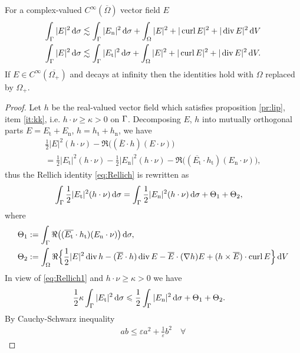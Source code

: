 \begin{lmm}\label{lm:start}
  For a complex-valued $C^{\infty}(\overline{\Omega})$ vector field $E$
  \begin{align}
    \int_{\Gamma}|E|^2\,\text{d}\sigma &\lesssim \int_{\Gamma}|E_{\text{n}}|^2\,\text{d}\sigma+\int_{\Omega}|E|^2+|\operatorname{curl} E|^2+|\operatorname{div} E|^2\,\text{d}V
    \label{eq:En}\\
    \int_{\Gamma}|E|^2\,\text{d}\sigma &\lesssim \int_{\Gamma}|E_{\text{t}}|^2\,\text{d}\sigma+\int_{\Omega}|E|^2+|\operatorname{curl} E|^2+|\operatorname{div} E|^2\,\text{d}V
    \label{eq:Et}.
  \end{align}
  If $E\in C^{\infty}(\overline{\Omega_+})$ and decays at infinity then the
  identities hold with $\Omega$ replaced by $\Omega_+$.
\end{lmm}
\begin{proof}
  Let $h$ be the real-valued vector field which satisfies proposition 
  \ref{pr:lip}, item \eqref{it:kk}, i.e. $h\cdot\nu\geqslant\kappa>0$ on $\Gamma$. Decomposing $E$, $h$ into mutually orthogonal parts 
  $E=E_{\text{t}}+E_{\text{n}}$, $h=h_{\text{t}}+h_{\text{n}}$, we have 
  \begin{multline*}
    \frac{1}{2}|E|^2(h\cdot\nu)-\Re\bigl((\overline{E}\cdot h)(E\cdot\nu)
    \bigr)\\
    =\frac{1}{2}|E_{\text{t}}|^2(h\cdot\nu)-\frac{1}{2}|E_{\text{n}}|^2(h\cdot\nu)-
    \Re\bigl((\overline{E_{\text{t}}}\cdot h_{\text{t}})(E_{\text{n}}\cdot\nu)\bigr),
  \end{multline*}
  thus the Rellich identity \eqref{eq:Rellich} is rewritten as
  \begin{align}
    \int_{\Gamma}\frac{1}{2}|E_{\text{t}}|^2(h\cdot\nu)\,\text{d}\sigma&=
    \int_{\Gamma}\frac{1}{2}|E_{\text{n}}|^2(h\cdot\nu)\,\text{d}\sigma+\Theta_1+\Theta_2,
    \label{eq:Rellich1}
  \end{align}
  where
  \begin{align*}
    \Theta_1 &:=\int_{\Gamma}\Re\bigl((\overline{E_{\text{t}}}\cdot h_{\text{t}})(E_{\text{n}}\cdot\nu)\bigr)\,\text{d}\sigma,
    \\
    \Theta_2 &:=\int_{\Omega}\Re\Bigl\{\frac{1}{2}|E|^2\operatorname{div} h-(\overline{E}\cdot h)
    \operatorname{div} E-\overline{E}\cdot(\nabla h)E+(h\times\overline{E})\cdot\operatorname{curl} E
    \Bigr\}\,\text{d}V
  \end{align*}
  In view of \eqref{eq:Rellich1} and $h\cdot\nu\geqslant\kappa>0$
  we have
  \begin{align}\label{eq:ineq1}
    \frac{1}{2}\kappa\int_{\Gamma}|E_{\text{t}}|^2\,\text{d}\sigma&\leqslant\frac{1}{2}\int_{\Gamma}|E_{\text{n}}|^2\,\text{d}\sigma
    +\Theta_1+\Theta_2.
  \end{align} 
  By Cauchy-Schwarz inequality 
  \begin{align*}
    ab\leqslant\varepsilon a^2+\frac{1}{\varepsilon}b^2\quad\forall

\end{align*}
\end{proof}
